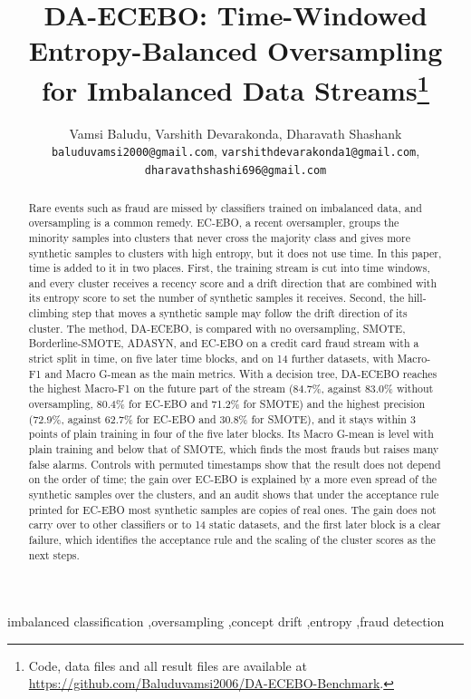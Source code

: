 \documentclass[preprint,10pt]{elsarticle}
\begin{document}
\begin{frontmatter}
\title{DA-ECEBO: Time-Windowed Entropy-Balanced Oversampling for Imbalanced Data Streams\thanks{Code, data files and all result files are available at \url{https://github.com/Baluduvamsi2006/DA-ECEBO-Benchmark}.}}
\author{Vamsi Baludu, Varshith Devarakonda, Dharavath Shashank\\[4pt]
{\small\texttt{baluduvamsi2000@gmail.com}, \texttt{varshithdevarakonda1@gmail.com}, \texttt{dharavathshashi696@gmail.com}}}
\begin{abstract}
Rare events such as fraud are missed by classifiers trained on imbalanced data, and oversampling is a common remedy. EC-EBO, a recent oversampler, groups the minority samples into clusters that never cross the majority class and gives more synthetic samples to clusters with high entropy, but it does not use time. In this paper, time is added to it in two places. First, the training stream is cut into time windows, and every cluster receives a recency score and a drift direction that are combined with its entropy score to set the number of synthetic samples it receives. Second, the hill-climbing step that moves a synthetic sample may follow the drift direction of its cluster. The method, DA-ECEBO, is compared with no oversampling, SMOTE, Borderline-SMOTE, ADASYN, and EC-EBO on a credit card fraud stream with a strict split in time, on five later time blocks, and on 14 further datasets, with Macro-F1 and Macro G-mean as the main metrics. With a decision tree, DA-ECEBO reaches the highest Macro-F1 on the future part of the stream (84.7\%, against 83.0\% without oversampling, 80.4\% for EC-EBO and 71.2\% for SMOTE) and the highest precision (72.9\%, against 62.7\% for EC-EBO and 30.8\% for SMOTE), and it stays within 3 points of plain training in four of the five later blocks. Its Macro G-mean is level with plain training and below that of SMOTE, which finds the most frauds but raises many false alarms. Controls with permuted timestamps show that the result does not depend on the order of time; the gain over EC-EBO is explained by a more even spread of the synthetic samples over the clusters, and an audit shows that under the acceptance rule printed for EC-EBO most synthetic samples are copies of real ones. The gain does not carry over to other classifiers or to 14 static datasets, and the first later block is a clear failure, which identifies the acceptance rule and the scaling of the cluster scores as the next steps.
\end{abstract}
\begin{keyword}
imbalanced classification \sep oversampling \sep concept drift \sep entropy \sep fraud detection
\end{keyword}
\end{frontmatter}
\end{document}
